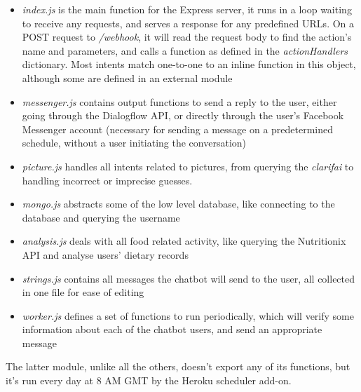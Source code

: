 \begin{itemize}
  \item \textit{index.js} is the main function for the Express server, it runs in a loop waiting to receive any requests, and serves a response for any predefined URLs. On a POST request to \textit{/webhook}, it will read the request body to find the action's name and parameters, and calls a function as defined in the \textit{actionHandlers} dictionary. Most intents match one-to-one to an inline function in this object, although some are defined in an external module
  \item \textit{messenger.js} contains output functions to send a reply to the user, either going through the Dialogflow API, or directly through the user's Facebook Messenger account (necessary for sending a message on a predetermined schedule, without a user initiating the conversation)
  \item \textit{picture.js} handles all intents related to pictures, from querying the \textit{clarifai} to handling incorrect or imprecise guesses.
  \item \textit{mongo.js} abstracts some of the low level database, like connecting to the database and querying the username
  \item \textit{analysis.js} deals with all food related activity, like querying the Nutritionix API and analyse users' dietary records
  \item \textit{strings.js} contains all messages the chatbot will send to the user, all collected in one file for ease of editing
  \item \textit{worker.js} defines a set of functions to run periodically, which will verify some information about each of the chatbot users, and send an appropriate message
\end{itemize}
The latter module, unlike all the others, doesn't export any of its functions, but it's run every day at 8 AM GMT by the Heroku scheduler add-on.
